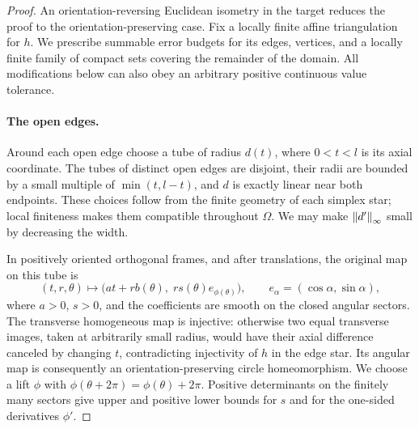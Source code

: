 \begin{proof}
An orientation-reversing Euclidean isometry in the target reduces
the proof to the orientation-preserving case.  Fix a locally finite
affine triangulation for $h$.  We prescribe summable error budgets
for its edges, vertices, and a locally finite family of compact sets
covering the remainder of the domain.  All modifications below can
also obey an arbitrary positive continuous value tolerance.

\paragraph{The open edges.}
Around each open edge choose a tube of radius $d(t)$, where
$0<t<l$ is its axial coordinate.  The tubes of distinct open edges
are disjoint, their radii are bounded by a small multiple of
$\min(t,l-t)$, and $d$ is exactly linear near both endpoints.
These choices follow from the finite geometry of each simplex star;
local finiteness makes them compatible throughout $\Omega$.
We may make $\left\lVert d'\right\rVert_\infty$ small by decreasing the width.

In positively oriented orthogonal frames, and after translations,
the original map on this tube is
\begin{equation}
 \label{sm:edge-form}
 (t,r,\theta)\longmapsto
 \bigl(at+r b(\theta),\;r s(\theta)e_{\phi(\theta)}\bigr),
 \qquad e_\alpha=(\cos\alpha,\sin\alpha),
\end{equation}
where $a>0$, $s>0$, and the coefficients are smooth on the closed
angular sectors.  The transverse homogeneous map is injective:
otherwise two equal transverse images, taken at arbitrarily small
radius, would have their axial difference canceled by changing $t$,
contradicting injectivity of $h$ in the edge star.  Its angular
map is consequently an orientation-preserving circle
homeomorphism.  We choose a lift $\phi$ with
$\phi(\theta+2\pi)=\phi(\theta)+2\pi$.
Positive determinants on the finitely many sectors give upper and
positive lower bounds for $s$ and for the one-sided derivatives
$\phi'$.


\end{proof}
